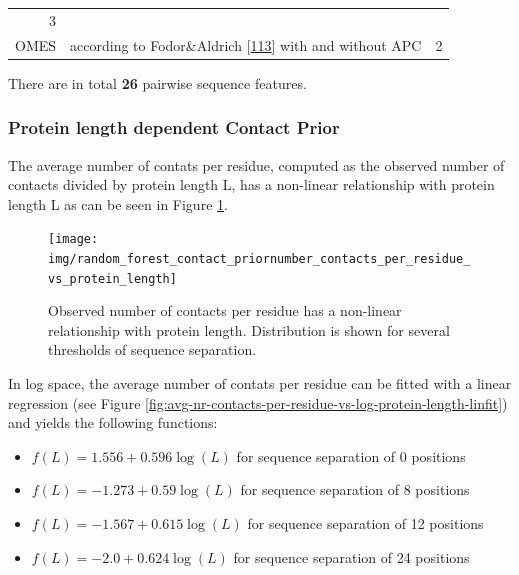 \documentclass[12pt,a4paper,twoside]{book}
\providecommand{\tightlist}{%
  \setlength{\itemsep}{0pt}\setlength{\parskip}{0pt}}
\theoremstyle{definition}
\theoremstyle{definition}
\theoremstyle{remark}
\begin{document}
\begin{longtable}[]{@{}rlc@{}}
\begin{minipage}[t]{0.18\columnwidth}
3\strut
\end{minipage}\tabularnewline
\begin{minipage}[t]{0.23\columnwidth}\raggedleft\strut
OMES\strut
\end{minipage} & \begin{minipage}[t]{0.50\columnwidth}\raggedright\strut
according to Fodor\&Aldrich
{[}\protect\hyperlink{ref-Fodor2004a}{113}{]} with and without APC\strut
\end{minipage} & \begin{minipage}[t]{0.18\columnwidth}\centering\strut
2\strut
\end{minipage}\tabularnewline
\bottomrule
\end{longtable}

There are in total \textbf{26} pairwise sequence features.

\subsubsection{Protein length dependent Contact
Prior}\label{contact-prior-protein-length}

The average number of contats per residue, computed as the observed
number of contacts divided by protein length L, has a non-linear
relationship with protein length L as can be seen in Figure
\ref{fig:avg-nr-contacts-per-residue-vs-protein-length}.






\begin{figure}

{\centering \texttt{[image: img/random\_forest\_contact\_priornumber\_contacts\_per\_residue\_vs\_protein\_length]} 

}

\caption{Observed
number of contacts per residue has a non-linear relationship with
protein length. Distribution is shown for several thresholds of sequence
separation.}\label{fig:avg-nr-contacts-per-residue-vs-protein-length}
\end{figure}

In log space, the average number of contats per residue can be fitted
with a linear regression (see Figure
\ref{fig:avg-nr-contacts-per-residue-vs-log-protein-length-linfit}) and
yields the following functions:

\begin{itemize}
\tightlist
\item
  \(f(L) = 1.556 + 0.596 \log (L)\) for sequence separation of 0
  positions
\item
  \(f(L) = -1.273 + 0.59 \log (L)\) for sequence separation of 8
  positions
\item
  \(f(L) = -1.567 + 0.615 \log (L)\) for sequence separation of 12
  positions
\item
  \(f(L) = -2.0 + 0.624 \log (L)\) for sequence separation of 24
  positions
\end{itemize}
\end{document}
